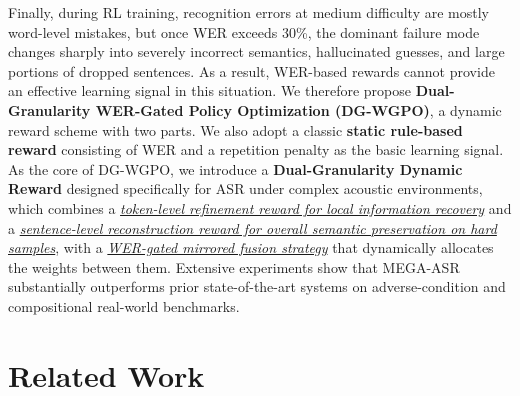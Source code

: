 \documentclass{llmxive}
\begin{document}
Finally, during RL training, recognition errors at medium difficulty are mostly word-level mistakes, but once WER exceeds 30\%, the dominant failure mode changes sharply into severely incorrect semantics, hallucinated guesses, and large portions of dropped sentences. As a result, WER-based rewards cannot provide an effective learning signal in this situation. We therefore propose \textbf{Dual-Granularity WER-Gated Policy Optimization (DG-WGPO)}, a dynamic reward scheme with two parts. We also adopt a classic \textbf{static rule-based reward} consisting of WER and a repetition penalty as the basic learning signal. As the core of DG-WGPO, we introduce a \textbf{Dual-Granularity Dynamic Reward} designed specifically for ASR under complex acoustic environments, which combines a \underline{\textit{token-level refinement reward for local information recovery}} and a \underline{\textit{sentence-level reconstruction reward for overall semantic preservation on hard samples}}, with a \underline{\textit{WER-gated mirrored fusion strategy}} that dynamically allocates the weights between them. Extensive experiments show that MEGA-ASR substantially outperforms prior state-of-the-art systems on adverse-condition and compositional real-world benchmarks.

\vspace{-2mm}
\section{Related Work}
\vspace{-2mm}
\end{document}
